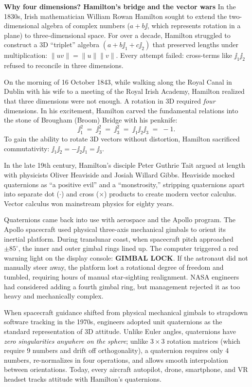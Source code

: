 \begin{whybox}
\textbf{Why four dimensions? Hamilton's bridge and the vector wars}
In the 1830s, Irish mathematician William Rowan Hamilton sought to extend the two-dimensional algebra of complex numbers ($a + b\jj$, which represents rotation in a plane) to three-dimensional space. For over a decade, Hamilton struggled to construct a 3D ``triplet'' algebra $(a + b\jj_1 + c\jj_2)$ that preserved lengths under multiplication: $\|uv\| = \|u\|\|v\|$. Every attempt failed: cross-terms like $\jj_1 \jj_2$ refused to reconcile in three dimensions.

On the morning of 16 October 1843, while walking along the Royal Canal in Dublin with his wife to a meeting of the Royal Irish Academy, Hamilton realized that three dimensions were not enough. A rotation in 3D required \emph{four} dimensions. In his excitement, Hamilton carved the fundamental relations into the stone of Brougham (Broom) Bridge with his penknife:
\[
  \jj_1^2 \;=\; \jj_2^2 \;=\; \jj_3^2 \;=\; \jj_1 \jj_2 \jj_3 \;=\; -1.
\]
To gain the ability to rotate 3D vectors without distortion, Hamilton sacrificed commutativity: $\jj_1 \jj_2 = -\jj_2 \jj_1 = \jj_3$.

In the late 19th century, Hamilton's disciple Peter Guthrie Tait argued at length with physicists Oliver Heaviside and Josiah Willard Gibbs. Heaviside mocked quaternions as ``a positive evil'' and a ``monstrosity,'' stripping quaternions apart into separate dot ($\cdot$) and cross ($\times$) products to create modern vector calculus. Vector calculus won mainstream physics for eighty years.

Quaternions came back into use with aerospace and the Apollo program. The Apollo spacecraft used physical three-axis mechanical gimbals to orient its inertial platform. During translunar coast, when spacecraft pitch approached $\pm 85^\circ$, the inner and outer gimbal rings lined up. The computer triggered a red warning light on the display console: \textbf{GIMBAL LOCK}. If the astronaut did not manually steer away, the platform lost a rotational degree of freedom and tumbled, requiring hours of manual star-sighting realignment. NASA engineers had considered adding a fourth gimbal ring, but management rejected it as too heavy and mechanically complex.

When spacecraft guidance shifted from physical mechanical gimbals to strapdown software tracking in the 1970s, engineers adopted unit quaternions as the standard representation of 3D attitude. Unlike Euler angles, quaternions have \emph{zero singularities anywhere on the sphere}; unlike $3\times 3$ rotation matrices (which require 9 numbers and drift off orthogonality), a quaternion requires only 4 numbers, re-normalizes in four operations, and allows smooth interpolation between orientations. Today, every aircraft autopilot, drone, smartphone, and VR headset tracks attitude with Hamilton's quaternions.
\end{whybox}


